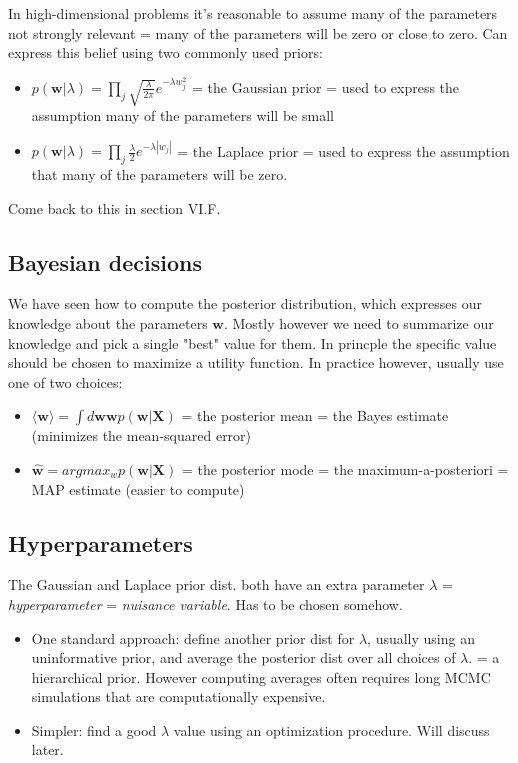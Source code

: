 \documentclass[norsk,a4paper,11pt]{article}
\begin{document}
In high-dimensional problems it's reasonable to assume many of the parameters not strongly relevant = many of the parameters will be zero or close to zero. Can express this belief using two commonly used priors:
\begin{itemize}
	\item $p(\mathbf{w}|\lambda) = \prod_j \sqrt{\frac{\lambda}{2\pi}} e^{-\lambda w_j^2}$ = the Gaussian prior = used to express the assumption many of the parameters will be small
	\item $p(\mathbf{w}|\lambda) = \prod_j \frac{\lambda}{2} e^{-\lambda |w_j|}$ = the Laplace prior = used to express the assumption that many of the parameters will be zero.
\end{itemize}
Come back to this in section VI.F.

\subsection{Bayesian decisions}
We have seen how to compute the posterior distribution, which expresses our knowledge about the parameters $\mathbf{w}$. Mostly however we need to summarize our knowledge and pick a single "best" value for them. In princple the specific value should be chosen to maximize a utility function. In practice however, usually use one of two choices:
\begin{itemize}
	\item $\langle \mathbf{w} \rangle = \int  d\mathbf{w}  \mathbf{w}p(\mathbf{w}|\mathbf{X})$ = the posterior mean = the Bayes estimate (minimizes the mean-squared error)
	\item $\hat{\mathbf{w}} = argmax_w p(\mathbf{w}|\mathbf{X})$ = the posterior mode = the maximum-a-posteriori = MAP estimate (easier to compute)
\end{itemize}

\subsection{Hyperparameters}
The Gaussian and Laplace prior dist. both have an extra parameter $\lambda$ = \textit{hyperparameter} = \textit{nuisance variable}. Has to be chosen somehow.
\begin{itemize}
	\item One standard approach: define another prior dist for $\lambda$, usually using an uninformative prior, and average the posterior dist over all choices of $\lambda$. = a hierarchical prior. However computing averages often requires long MCMC simulations that are computationally expensive.
	\item Simpler: find a good $\lambda$ value using an optimization procedure. Will discuss later.
\end{itemize}
\end{document}
